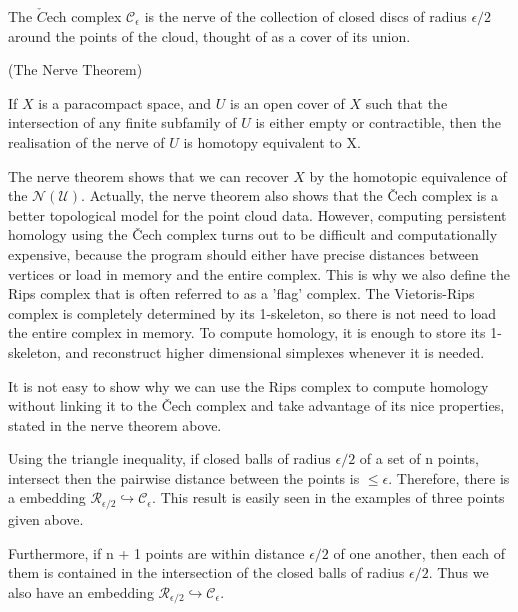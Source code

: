 \documentclass[11pt,a4paper]{report}
\begin{document}
              
              The $\check{C}$ech complex $\mathcal{C}_\epsilon$ is the nerve of the collection of closed discs of radius $\epsilon/2$ around the points of the cloud, thought of as a cover of its union.
              \begin{thm}(The Nerve Theorem)
              
            If $X$ is a paracompact space, and $U$ is an open cover of $X$ such that the
            intersection of any finite subfamily of $U$ is either empty or contractible,
            then the realisation of the nerve of $U$ is homotopy equivalent to X.\cite{hatcher}
            
              \end{thm}
              
            The nerve theorem shows that we can recover $X$ by the homotopic equivalence of the $\mathcal{N}(\mathcal{U})$. Actually, the nerve theorem also shows that the \v{C}ech complex
            is a better topological model for the point cloud data. However, computing persistent homology using the \v{C}ech complex turns out to be difficult and computationally expensive, because the program should either have precise distances between vertices or load in memory and the entire complex. This is why we also define the Rips complex that is often referred to as a 'flag' complex. The Vietoris-Rips complex is completely determined by its 1-skeleton, so there is not need to load the entire complex in memory. To compute homology, it is enough to store its 1-skeleton, and reconstruct higher dimensional simplexes whenever it is needed.
            
            It is not easy to show why we can use the Rips complex to compute homology without linking
            it to the \v{C}ech complex and take advantage of its nice properties, stated in the nerve theorem above.
            
            Using the triangle inequality, if closed balls of radius $\epsilon/2$ of a set of n points,
            intersect then the pairwise distance between the points is $\leq \epsilon$. Therefore, 
            there is a embedding $\mathcal{R}_{\epsilon/2} \hookrightarrow \mathcal{C}_\epsilon$. This result is easily seen in the examples of three points given above. 
            
            Furthermore, if n + 1 points are within distance $\epsilon/2$ of one another, then
            each of them is contained in the intersection of the closed balls of radius $\epsilon/2$. Thus we also have an embedding $\mathcal{R}_{\epsilon/2} \hookrightarrow \mathcal{C}_\epsilon$.
            
\end{document}
